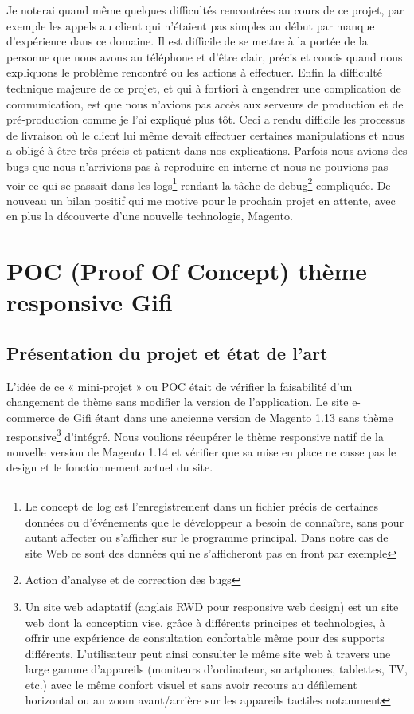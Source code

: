 \documentclass[a4paper,11pt,twoside]{report}
\begin{document}
    Je noterai quand même quelques difficultés rencontrées au cours de ce projet, par exemple les appels au client qui n'étaient pas simples au début par manque d'expérience dans ce domaine. Il est difficile de se mettre à la portée de la personne que nous avons au téléphone et d'être clair, précis et concis quand nous expliquons le problème rencontré ou les actions à effectuer. 
    Enfin la difficulté technique majeure de ce projet, et qui à fortiori à engendrer une complication de communication, est que nous n'avions pas accès aux serveurs de production et de pré-production comme je l'ai expliqué plus tôt. Ceci a rendu difficile les processus de livraison où le client lui même devait effectuer certaines manipulations et nous a obligé à être très précis et patient dans nos explications. Parfois nous avions des bugs que nous n'arrivions pas à reproduire en interne et nous ne pouvions pas voir ce qui se passait dans les logs\footnote{Le concept de log est l'enregistrement dans un fichier précis de certaines données ou d'événements que le développeur a besoin de connaître, sans pour autant affecter ou s'afficher sur le programme principal. Dans notre cas de site Web ce sont des données qui ne s'afficheront pas en front par exemple} rendant la tâche de debug\footnote{Action d'analyse et de correction des bugs} compliquée. De nouveau un bilan positif qui me motive pour le prochain projet en attente, avec en plus la découverte d'une nouvelle technologie, Magento.
    
    \newpage
    
  \section{POC (Proof Of Concept) thème responsive Gifi}
    \subsection*{Présentation du projet et état de l'art}
    L'idée de ce « mini-projet » ou POC était de vérifier la faisabilité d'un changement de thème sans modifier la version de l'application. Le site e-commerce de Gifi étant dans une ancienne version de Magento 1.13 sans thème responsive\footnote{Un site web adaptatif (anglais RWD pour responsive web design) est un site web dont la conception vise, grâce à différents principes et technologies, à offrir une expérience de consultation confortable même pour des supports différents. L'utilisateur peut ainsi consulter le même site web à travers une large gamme d'appareils (moniteurs d'ordinateur, smartphones, tablettes, TV, etc.) avec le même confort visuel et sans avoir recours au défilement horizontal ou au zoom avant/arrière sur les appareils tactiles notamment} d'intégré. Nous voulions récupérer le thème responsive natif de la nouvelle version de Magento 1.14 et vérifier que sa mise en place ne casse pas le design et le fonctionnement actuel du site.
\end{document}

